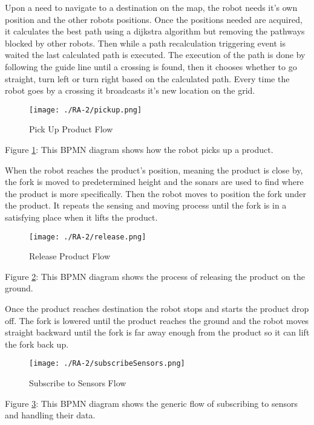 Upon a need to navigate to a destination on the map, the robot needs it's own position and the other robots positions. Once the positions needed are acquired, it calculates the best path using a dijkstra algorithm but removing the pathways blocked by other robots. Then while a path recalculation triggering event is waited the last calculated path is executed. The execution of the path is done by following the guide line until a crossing is found, then it chooses whether to go straight, turn left or turn right based on the calculated path. Every time the robot goes by a crossing it broadcasts it's new location on the grid.

\begin{figure}[ht!]
 \centering
 \texttt{[image: ./RA-2/pickup.png]}
 \caption{Pick Up Product Flow}
 \label{fig:pickup}
\end{figure}

Figure \ref{fig:pickup}: This BPMN diagram shows how the robot picks up a product.

When the robot reaches the product's position, meaning the product is close by, the fork is moved to predetermined height and the sonars are used to find where the product is more specifically. Then the robot moves to position the fork under the product. It repeats the sensing and moving process until the fork is in a satisfying place when it lifts the product.

\begin{figure}[ht!]
 \centering
 \texttt{[image: ./RA-2/release.png]}
 \caption{Release Product Flow}
 \label{fig:release}
\end{figure}

Figure \ref{fig:release}: This BPMN diagram shows the process of releasing the product on the ground.

Once the product reaches destination the robot stops and starts the product drop off. The fork is lowered until the product reaches the ground and the robot moves straight backward until the fork is far away enough from the product so it can lift the fork back up.

\begin{figure}[ht!]
 \centering
 \texttt{[image: ./RA-2/subscribeSensors.png]}
 \caption{Subscribe to Sensors Flow}
 \label{fig:subscribeSensors}
\end{figure}

Figure \ref{fig:subscribeSensors}: This BPMN diagram shows the generic flow of subscribing to sensors and handling their data.

